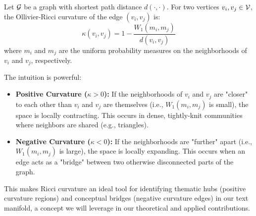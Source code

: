 \begin{definition}
Let $\mathcal{G}$ be a graph with shortest path distance $d(\cdot, \cdot)$. For two vertices $v_i, v_j \in \mathcal{V}$, the Ollivier-Ricci curvature of the edge $(v_i, v_j)$ is:
\begin{equation}
    \kappa(v_i, v_j) = 1 - \frac{W_1(m_i, m_j)}{d(v_i, v_j)}
\end{equation}
where $m_i$ and $m_j$ are the uniform probability measures on the neighborhoods of $v_i$ and $v_j$, respectively.
\end{definition}
The intuition is powerful:
\begin{itemize}
    \item \textbf{Positive Curvature ($\kappa > 0$):} If the neighborhoods of $v_i$ and $v_j$ are "closer" to each other than $v_i$ and $v_j$ are themselves (i.e., $W_1(m_i, m_j)$ is small), the space is locally contracting. This occurs in dense, tightly-knit communities where neighbors are shared (e.g., triangles).
    \item \textbf{Negative Curvature ($\kappa < 0$):} If the neighborhoods are "further" apart (i.e., $W_1(m_i, m_j)$ is large), the space is locally expanding. This occurs when an edge acts as a "bridge" between two otherwise disconnected parts of the graph.
\end{itemize}
This makes Ricci curvature an ideal tool for identifying thematic hubs (positive curvature regions) and conceptual bridges (negative curvature edges) in our text manifold, a concept we will leverage in our theoretical and applied contributions.